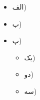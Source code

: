 
\begin{itemize}
	\item الف)
	\item ب)
	\item پ)
	\begin{itemize}
		\item یک)
		\item دو)
		\item سه)
	\end{itemize}
\end{itemize}